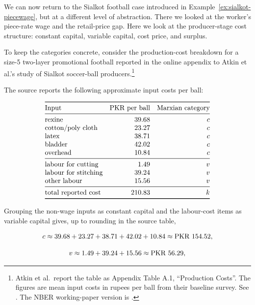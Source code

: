 \begin{example}
\label{ex:sialkot-costtable}

We can now return to the Sialkot football case introduced in
Example~\ref{ex:sialkot-piecewage}, but at a different level of abstraction.
There we looked at the worker's piece-rate wage and the retail-price gap. Here
we look at the producer-stage cost structure: constant capital, variable capital,
cost price, and surplus.

To keep the categories concrete, consider the production-cost breakdown for a
size-5 two-layer promotional football reported in the online appendix to Atkin
et al.'s study of Sialkot soccer-ball producers.\footnote{Atkin et al.\ report
the table as Appendix Table A.1, ``Production Costs''. The figures are mean
input costs in rupees per ball from their baseline survey. See
\cite{AtkinEtAl2017}. The NBER working-paper version is
\cite{AtkinEtAl2015NBER}.}

The source reports the following approximate input costs per ball:

\[
\begin{array}{@{}lrr@{}}
\toprule
\text{Input} & \text{PKR per ball} & \text{Marxian category}\\
\midrule
\text{rexine} & 39.68 & \constcap\\
\text{cotton/poly cloth} & 23.27 & \constcap\\
\text{latex} & 38.71 & \constcap\\
\text{bladder} & 42.02 & \constcap\\
\text{overhead} & 10.84 & \constcap\\
\midrule
\text{labour for cutting} & 1.49 & \varcap\\
\text{labour for stitching} & 39.24 & \varcap\\
\text{other labour} & 15.56 & \varcap\\
\midrule
\text{total reported cost} & 210.83 & k\\
\bottomrule
\end{array}
\]

Grouping the non-wage inputs as constant capital and the labour-cost items as
variable capital gives, up to rounding in the source table,

\[
c
\approx
39.68+23.27+38.71+42.02+10.84
\approx
\text{PKR }154.52,
\]

\[
v
\approx
1.49+39.24+15.56
\approx
\text{PKR }56.29,
\]


\end{example}
